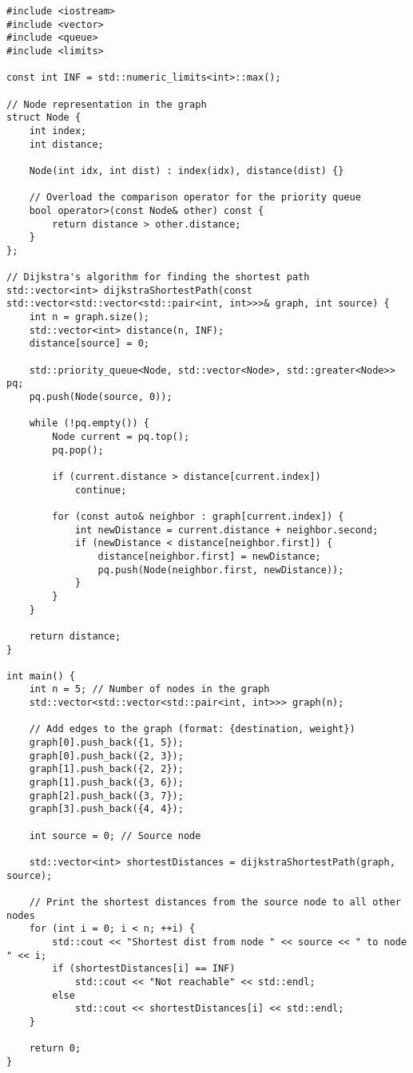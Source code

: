 \begin{verbatim}
#include <iostream>
#include <vector>
#include <queue>
#include <limits>

const int INF = std::numeric_limits<int>::max();

// Node representation in the graph
struct Node {
    int index;
    int distance;

    Node(int idx, int dist) : index(idx), distance(dist) {}

    // Overload the comparison operator for the priority queue
    bool operator>(const Node& other) const {
        return distance > other.distance;
    }
};

// Dijkstra's algorithm for finding the shortest path
std::vector<int> dijkstraShortestPath(const std::vector<std::vector<std::pair<int, int>>>& graph, int source) {
    int n = graph.size();
    std::vector<int> distance(n, INF);
    distance[source] = 0;

    std::priority_queue<Node, std::vector<Node>, std::greater<Node>> pq;
    pq.push(Node(source, 0));

    while (!pq.empty()) {
        Node current = pq.top();
        pq.pop();

        if (current.distance > distance[current.index])
            continue;

        for (const auto& neighbor : graph[current.index]) {
            int newDistance = current.distance + neighbor.second;
            if (newDistance < distance[neighbor.first]) {
                distance[neighbor.first] = newDistance;
                pq.push(Node(neighbor.first, newDistance));
            }
        }
    }

    return distance;
}

int main() {
    int n = 5; // Number of nodes in the graph
    std::vector<std::vector<std::pair<int, int>>> graph(n);

    // Add edges to the graph (format: {destination, weight})
    graph[0].push_back({1, 5});
    graph[0].push_back({2, 3});
    graph[1].push_back({2, 2});
    graph[1].push_back({3, 6});
    graph[2].push_back({3, 7});
    graph[3].push_back({4, 4});

    int source = 0; // Source node

    std::vector<int> shortestDistances = dijkstraShortestPath(graph, source);

    // Print the shortest distances from the source node to all other nodes
    for (int i = 0; i < n; ++i) {
        std::cout << "Shortest dist from node " << source << " to node " << i;
        if (shortestDistances[i] == INF)
            std::cout << "Not reachable" << std::endl;
        else
            std::cout << shortestDistances[i] << std::endl;
    }

    return 0;
}
\end{verbatim}

